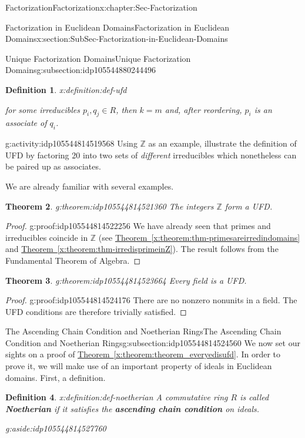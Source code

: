 \documentclass[oneside,10pt,]{book}
\newcommand{\xreffont}{\relax}
\newcommand{\terminology}[1]{\textbf{#1}}
\numberwithin{equation}{section}
\def\Z{{\mathbb Z}}
\newtheorem{theorem}{Theorem}[section]
\newtheorem{definition}[theorem]{Definition}
\begin{document}
\begin{chapterptx}{Factorization}{}{Factorization}{}{}{x:chapter:Sec-Factorization}
\begin{sectionptx}{Factorization in Euclidean Domains}{}{Factorization in Euclidean Domains}{}{}{x:section:SubSec-Factorization-in-Euclidean-Domains}
\begin{subsectionptx}{Unique Factorization Domains}{}{Unique Factorization Domains}{}{}{g:subsection:idp105544880244496}
\begin{definition}{}{x:definition:def-ufd}
\begin{enumerate}
for some irreducibles \(p_i, q_j\in R\), then \(k=m\) and, after reordering, \(p_i\) is an associate of \(q_i\).%
\end{enumerate}
%
\end{definition}
\begin{activity}{}{g:activity:idp105544814519568}%
Using \(\Z\) as an example, illustrate the definition of UFD by factoring 20 into two sets of \emph{different} irreducibles which nonetheless can be paired up as associates.%
\end{activity}%
We are already familiar with several examples.%
\begin{theorem}{}{}{g:theorem:idp105544814521360}%
The integers \(\Z\) form a UFD.%
\end{theorem}
\begin{proof}{}{g:proof:idp105544814522256}
We have already seen that primes and irreducibles coincide in \(\Z\) (see \hyperref[x:theorem:thm-primesareirredindomains]{Theorem~{\xreffont\ref{x:theorem:thm-primesareirredindomains}}} and \hyperref[x:theorem:thm-irredisprimeinZ]{Theorem~{\xreffont\ref{x:theorem:thm-irredisprimeinZ}}}). The result follows from the Fundamental Theorem of Algebra.\end{proof}
\begin{theorem}{}{}{g:theorem:idp105544814523664}%
Every field is a UFD.%
\end{theorem}
\begin{proof}{}{g:proof:idp105544814524176}
There are no nonzero nonunits in a field. The UFD conditions are therefore trivially satisfied.\end{proof}
\end{subsectionptx}
%
%
\typeout{************************************************}
\typeout{************************************************}
%
\begin{subsectionptx}{The Ascending Chain Condition and Noetherian Rings}{}{The Ascending Chain Condition and Noetherian Rings}{}{}{g:subsection:idp105544814524560}
We now set our sights on a proof of \hyperref[x:theorem:theorem_everyedisufd]{Theorem~{\xreffont\ref{x:theorem:theorem_everyedisufd}}}. In order to prove it, we will make use of an important property of ideals in Euclidean domains. First, a definition.%
\begin{definition}{}{x:definition:def-noetherian}%
A commutative ring \(R\) is called \terminology{Noetherian} if it satisfies the \terminology{ascending chain condition} on ideals. \begin{aside}{}{g:aside:idp105544814527760}%

\end{aside}
\end{definition}
\end{subsectionptx}
\end{sectionptx}
\end{chapterptx}
\end{document}
